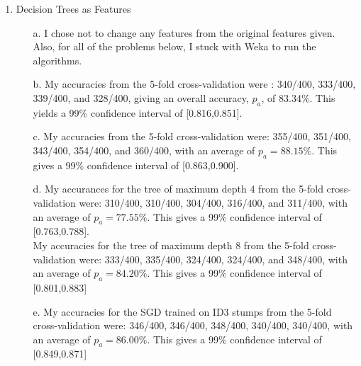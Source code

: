 \begin{enumerate}
\item Decision Trees as Features
      \begin{enumerate}
        \item[a.]
                I chose not to change any features from the original features given. Also, for all of the problems below, I stuck with Weka to run the algorithms.
        \item[b.]
                My accuracies from the 5-fold cross-validation were : 340/400, 333/400, 339/400, and 328/400, giving an overall accuracy, $p_a$, of 83.34\%. This yields a 99\% confidence interval of [0.816,0.851].
        \item[c.]
                My accuracies from the 5-fold cross-validation were: 355/400, 351/400, 343/400, 354/400, and 360/400, with an average of $p_a = 88.15\%$. This gives a 99\% confidence interval of [0.863,0.900]. 
        \item[d.]
                My accurances for the tree of maximum depth 4 from the 5-fold cross-validation were: 310/400, 310/400, 304/400, 316/400, and 311/400, with an average of $p_a = 77.55\%$. This gives a 99\% confidence interval of [0.763,0.788].
\\
                My accuracies for the tree of maximum depth 8 from the 5-fold cross-validation were: 333/400, 335/400, 324/400, 324/400, and 348/400, with an average of $p_a = 84.20\%$. This gives a 99\% confidence interval of [0.801,0.883]
        \item[e.]
                My accuracies for the SGD trained on ID3 stumps from the 5-fold cross-validation were: 346/400, 346/400, 348/400, 340/400, 340/400, with an average of $p_a = 86.00\%$. This gives a 99\% confidence interval of [0.849,0.871]
      \end{enumerate}


\end{enumerate}
